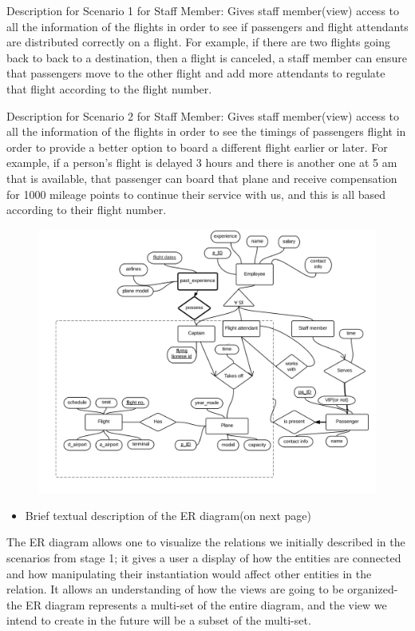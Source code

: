 \documentclass[10pt,conference]{IEEEtran}
\begin{document}
\textnormal{Description for Scenario 1 for Staff Member: Gives staff member(view) access to all the information of the flights in order to see if passengers and flight attendants are distributed correctly on a flight. For example, if there are two flights going back to back to a destination, then a flight is canceled, a staff member can ensure that passengers move to the other flight and add more attendants to regulate that flight according to the flight number. }




\textnormal{Description for Scenario 2 for Staff Member: Gives staff member(view) access to all the information of the flights in order to see the timings of passengers flight in order to provide a better option to board a different flight earlier or later. For example, if a person's flight is delayed 3 hours and there is another one at 5 am that is available, that passenger can board that plane and receive compensation for 1000 mileage points to continue their service with us, and this is all based according to their flight number.}


\begin{figure}
\centering
\includegraphics[width=.50\textwidth]{final_icloud_chart.png}
\end{figure}



\vspace{5mm}

\begin{itemize} \item{Brief textual description of the ER diagram(on next page)} \end{itemize}
\textnormal{The ER diagram allows one to visualize the relations we initially described in the scenarios from stage 1; it gives a user a display of how the entities are connected and how manipulating their instantiation would affect other entities in the relation. It allows an understanding of how the views are going to be organized- the ER diagram represents a multi-set of the entire diagram, and the view we intend to create in the future will be a subset of the multi-set.}
\end{document}
